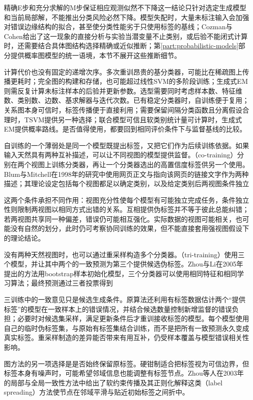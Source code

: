 精确E步和充分求解的M步保证相应观测似然不下降这一结论只针对选定生成模型和当前局部解，不能推出分类风险必然下降。模型失配时，大量未标注输入会加强对错误边缘结构的拟合，甚至使分类性能劣于只使用标签的基线；Cozman与Cohen给出了这一现象的直接分析与实验当潜变量不止类别，或后验不能闭式计算时，还需要结合具体图结构选择精确或近似推断；第\ref{part:probabilistic-models}部分提供概率图模型的统一语境，本节不展开这些推断细节。

计算代价也没有固定的递增次序。多次重训昂贵的基分类器，可能比在稀疏图上传播更耗时；完全图的构建和存储，也可能超过线性SVM的多阶段训练；生成式EM则需反复计算未标注样本的后验并更新参数。选型需要同时考虑样本数、特征维数、类别数、边数、基求解器与迭代次数。已有稳定分类器时，自训练便于复用；关系图本身可信时，标签传播便于直接利用；需要保留间隔分类函数且分离假设合理时，TSVM提供另一种选择；联合模型可信且软类别统计量可计算时，生成式EM提供概率路线。是否值得使用，都要回到相同评价条件下与监督基线的比较。

自训练的一个薄弱处是同一个模型既提出标签，又把它们作为后续训练依据。如果输入天然具有两种互补描述，可以让不同视图的模型提供监督。（co-training）分别在两个视图上训练分类器，再让一个分类器选出的高置信度标签供另一个使用。Blum与Mitchell在1998年的研究中使用网页正文与指向该网页的链接文字作为两种描述；其理论设定包括每个视图都足以确定类别，以及给定类别后两视图条件独立

这两个条件承担不同作用：视图充分性使每个模型有可能独立完成任务，条件独立性则限制两视图以相同方式出错的关系。互相提供伪标签并不等于彼此总能纠错；若两视图共享同一种偏差，错误仍可能相互强化。实际数据的视图可能相关，也可能没有自然的划分，此时仍可考察协同训练的效果，但不能直接套用强视图假设下的理论结论。

没有两种天然视图时，也可以通过重采样构造多个分类器。（tri-training）使用三个模型，并让其中两个的一致预测为第三个提供候选伪标签。Zhou与Li在2005年提出的方法用bootstrap样本初始化模型，三个分类器可以使用相同特征和相同学习算法；最终预测通过三者投票得到

三训练中的一致意见只是候选生成条件。原算法还利用有标签数据估计两个“提供标签”的模型在一致样本上的错误情况，并结合候选数量控制新增监督的错误负担；必要时对候选集采样，满足更新条件后才重训接收标签的模型。每个模型使用自己的临时伪标签集，与原始有标签集结合训练，而不是把所有一致预测永久变成真实标签。重采样制造的差异能否带来有用互补，仍受样本覆盖与模型错误相关性影响。

图方法的另一项选择是是否始终保留原标签。硬钳制适合把标签视为可信边界，但标签本身有噪声时，可能希望邻域信息也能调整有标签节点。Zhou等人在2003年的局部与全局一致性方法中给出了软约束传播及其正则化解释这类（label spreading）方法使节点在邻域平滑与贴近初始标签之间折中。

